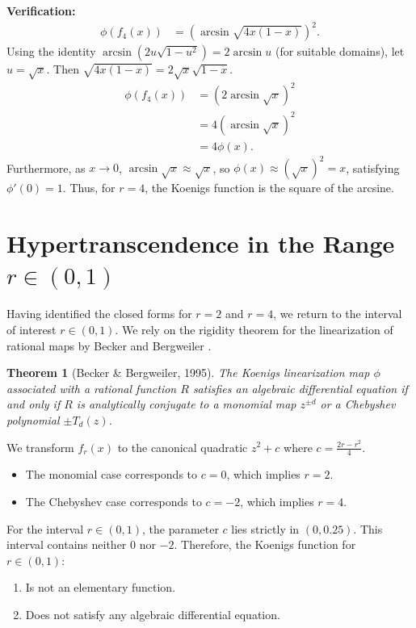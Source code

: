 \documentclass[11pt, a4paper]{article}
\newtheorem{theorem}{Theorem}[section]
\theoremstyle{definition}
\begin{document}
\textbf{Verification:}
\begin{align*}
\phi(f_4(x)) &= \left( \arcsin \sqrt{4x(1-x)} \right)^2.
\end{align*}
Using the identity $\arcsin(2u\sqrt{1-u^2}) = 2\arcsin u$ (for suitable domains), let $u=\sqrt{x}$. Then $\sqrt{4x(1-x)} = 2\sqrt{x}\sqrt{1-x}$.
\begin{align*}
\phi(f_4(x)) &= \left( 2 \arcsin \sqrt{x} \right)^2 \\
&= 4 \left( \arcsin \sqrt{x} \right)^2 \\
&= 4\phi(x).
\end{align*}
Furthermore, as $x \to 0$, $\arcsin \sqrt{x} \approx \sqrt{x}$, so $\phi(x) \approx (\sqrt{x})^2 = x$, satisfying $\phi'(0)=1$.
Thus, for $r=4$, the Koenigs function is the square of the arcsine.

\section{Hypertranscendence in the Range $r \in (0,1)$}

Having identified the closed forms for $r=2$ and $r=4$, we return to the interval of interest $r \in (0,1)$. We rely on the rigidity theorem for the linearization of rational maps by Becker and Bergweiler \cite{Becker1995}.

\begin{theorem}[Becker \& Bergweiler, 1995]
The Koenigs linearization map $\phi$ associated with a rational function $R$ satisfies an algebraic differential equation if and only if $R$ is analytically conjugate to a monomial map $z^{\pm d}$ or a Chebyshev polynomial $\pm T_d(z)$.
\end{theorem}

We transform $f_r(x)$ to the canonical quadratic $z^2 + c$ where $c = \frac{2r - r^2}{4}$.
\begin{itemize}
\item The monomial case corresponds to $c=0$, which implies $r=2$.
\item The Chebyshev case corresponds to $c=-2$, which implies $r=4$.
\end{itemize}

For the interval $r \in (0,1)$, the parameter $c$ lies strictly in $(0, 0.25)$. This interval contains neither $0$ nor $-2$. Therefore, the Koenigs function for $r \in (0,1)$:
\begin{enumerate}
\item Is not an elementary function.
\item Does not satisfy any algebraic differential equation.
\end{enumerate}
\end{document}
